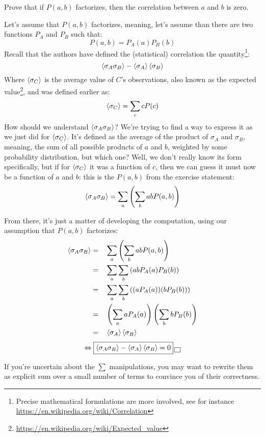 \documentclass[solutions.tex]{subfiles}
\begin{document}
\maketitle
\begin{exercise} Prove that if $P(a, b)$ factorizes, then
the correlation between $a$ and $b$ is zero.
\end{exercise}
Let's assume that $P(a, b)$ factorizes, meaning, let's assume
than there are two functions $P_A$ and $P_B$ such that:
\[
	P(a, b) = P_A(a)P_B(b)
\]
Recall that the authors have defined the (statistical) correlation
the quantity\footnote{Precise mathematical formulations are
more involved, see for instance
\url{https://en.wikipedia.org/wiki/Correlation}}:
\[
	\left\langle \sigma_A\sigma_B \right\rangle-\left\langle \sigma_A \right\rangle\left\langle \sigma_B \right\rangle
\]
Where $\left\langle \sigma_C \right\rangle$ is the average value of $C$'s observations,
also known as the expected
value\footnote{\url{https://en.wikipedia.org/wiki/Expected\_value}},
and was defined earlier as:
\[
	\left\langle \sigma_C \right\rangle = \sum_c cP(c)
\]
How should we understand $\left\langle \sigma_A\sigma_B \right\rangle$? We're trying to find
a way to express it as we just did for $\left\langle \sigma_C \right\rangle$. It's defined
as the average of the product of $\sigma_A$ and $\sigma_B$, meaning,
the sum of all possible products of $a$ and $b$, weighted by some probability
distribution, but which one? Well, we don't really know its form specifically,
but if for $\left\langle \sigma_C \right\rangle$ it was a function of $c$, then we can guess it
must now be a function of $a$ and $b$: this is the $P(a, b)$ from the exercise
statement:
\[
	\left\langle \sigma_A\sigma_B \right\rangle = \sum_a\left(\sum_b ab P(a, b)\right)
\]

From there, it's just a matter of developing the computation,
using our assumption that $P(a, b)$ factorizes:
\begin{equation*}\begin{aligned}
	\left\langle \sigma_A\sigma_B \right\rangle &=&& \sum_a\left(\sum_b ab P(a, b)\right) \\
	~ &=&& \sum_a\sum_b \left(ab P_A(a)P_B(b)\right) \\
	~ &=&& \sum_a\sum_b \left((a P_A(a))(bP_B(b))\right) \\
	~ &=&& \left(\sum_a aP_A(a)\right)\left(\sum_bbP_B(b)\right) \\
	~ &=&& \left\langle \sigma_A \right\rangle\left\langle \sigma_B \right\rangle
\end{aligned}\end{equation*}
\[
	\Leftrightarrow
		\boxed{\left\langle \sigma_A\sigma_B \right\rangle - \left\langle \sigma_A \right\rangle\left\langle \sigma_B \right\rangle = 0}\,\boxed{\,}
\]

\begin{remark} If you're uncertain about the $\sum$ manipulations, you
may want to rewrite them as explicit sum over a small number of terms
to convince you of their correctness.
\end{remark}
\end{document}
